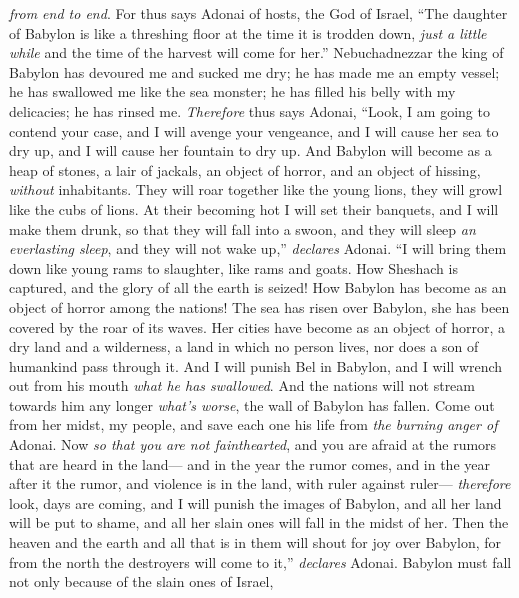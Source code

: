 \begin{biblechapter}
\textit{from end to end}.
\verse For thus says Adonai of hosts, the God of Israel,
\verse “The daughter of Babylon is like a threshing floor 
at the time it is trodden down, 
\textit{just a little while} 
and the time of the harvest will come for her.”
\verse Nebuchadnezzar the king of Babylon 
has devoured me and sucked me dry; 
he has made me an empty vessel; 
he has swallowed me like the sea monster; 
he has filled his belly with my delicacies; 
he has rinsed me.
\verse \textit{Therefore} thus says Adonai,
\verse “Look, I am going to contend your case, 
and I will avenge your vengeance, 
and I will cause her sea to dry up, 
and I will cause her fountain to dry up.
\verse And Babylon will become as a heap of stones, 
a lair of jackals, 
an object of horror, and an object of hissing, 
\textit{without} inhabitants.
\verse They will roar together like the young lions, 
they will growl like the cubs of lions.
\verse At their becoming hot I will set their banquets, 
and I will make them drunk, 
so that they will fall into a swoon, 
and they will sleep \textit{an everlasting sleep}, 
and they will not wake up,” \textit{declares} Adonai.
\verse “I will bring them down like young rams to slaughter, 
like rams and goats.
\verse How Sheshach is captured, 
and the glory of all the earth is seized! 
How Babylon has become as an object of horror 
among the nations!
\verse The sea has risen over Babylon, 
she has been covered by the roar of its waves.
\verse Her cities have become as an object of horror, 
a dry land and a wilderness, 
a land in which no person lives, 
nor does a son of humankind pass through it.
\verse And I will punish Bel in Babylon, 
and I will wrench out from his mouth \textit{what he has swallowed}. 
And the nations will not stream towards him any longer 
\textit{what’s worse}, the wall of Babylon has fallen.
\verse Come out from her midst, my people, 
and save each one his life 
from \textit{the burning anger of} Adonai.
\verse Now \textit{so that you are not fainthearted}, 
and you are afraid at the rumors that are heard in the land— 
and in the year the rumor comes, 
and in the year after it the rumor, 
and violence is in the land, 
with ruler against ruler—
\verse \textit{therefore} look, days are coming, 
and I will punish the images of Babylon, 
and all her land will be put to shame, 
and all her slain ones will fall in the midst of her.
\verse Then the heaven and the earth and all that is in them 
will shout for joy over Babylon, 
for from the north 
the destroyers will come to it,” \textit{declares} Adonai.
\verse Babylon must fall not only because of the slain ones of Israel, 

\end{biblechapter}
